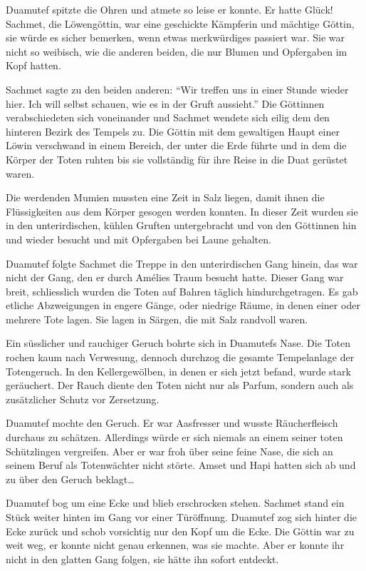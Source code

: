 \documentclass[11pt,titlepage,a5paper]{book}
\begin{document}
Duamutef spitzte die Ohren und atmete so leise er konnte. Er hatte Glück! Sachmet, die Löwengöttin, war eine geschickte Kämpferin und mächtige Göttin, sie würde es sicher bemerken, wenn etwas merkwürdiges passiert war. Sie war nicht so weibisch, wie die anderen beiden, die nur Blumen und Opfergaben im Kopf hatten.

Sachmet sagte zu den beiden anderen: "`Wir treffen uns in einer Stunde wieder hier. Ich will selbst schauen, wie es in der Gruft aussieht."' Die Göttinnen verabschiedeten sich voneinander und Sachmet wendete sich eilig dem den hinteren Bezirk des Tempels zu. Die Göttin mit dem gewaltigen Haupt einer Löwin verschwand in einem Bereich, der unter die Erde führte und in dem die Körper der Toten ruhten bis sie vollständig für ihre Reise in die Duat gerüstet waren.

 Die werdenden Mumien mussten eine Zeit in Salz liegen, damit ihnen die Flüssigkeiten aus dem Körper gesogen werden konnten. In dieser Zeit wurden sie in den unterirdischen, kühlen Gruften untergebracht und von den Göttinnen hin und wieder besucht und mit Opfergaben bei Laune gehalten.
 
Duamutef folgte Sachmet die Treppe in den unterirdischen Gang hinein, das war nicht der Gang, den er durch Amélies Traum besucht hatte. Dieser Gang war breit, schliesslich wurden die Toten auf Bahren täglich hindurchgetragen. Es gab etliche Abzweigungen in engere Gänge, oder niedrige Räume, in denen einer oder mehrere Tote lagen. Sie lagen in Särgen, die mit Salz randvoll waren.

Ein süsslicher und rauchiger Geruch bohrte sich in Duamutefs Nase. Die Toten rochen kaum nach Verwesung, dennoch durchzog die gesamte Tempelanlage der Totengeruch. In den Kellergewölben, in denen er sich jetzt befand, wurde stark geräuchert. Der Rauch diente den Toten nicht nur als Parfum, sondern auch als zusätzlicher Schutz vor Zersetzung.

Duamutef mochte den Geruch. Er war Aasfresser und wusste Räucherfleisch durchaus zu schätzen. Allerdings würde er sich niemals an einem seiner toten Schützlingen vergreifen. Aber er war froh über seine feine Nase, die sich an seinem Beruf als Totenwächter nicht störte. Amset und Hapi hatten sich ab und zu über den Geruch beklagt\dots

Duamutef bog um eine Ecke und blieb erschrocken stehen. Sachmet stand ein Stück weiter hinten im Gang vor einer Türöffnung. Duamutef zog sich hinter die Ecke zurück und schob vorsichtig nur den Kopf um die Ecke. Die Göttin war zu weit weg, er konnte nicht genau erkennen, was sie machte. Aber er konnte ihr nicht in den glatten Gang folgen, sie hätte ihn sofort entdeckt.
\end{document}
